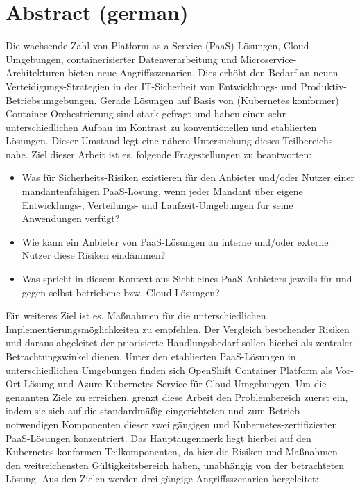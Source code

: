 \chapter*{Abstract (german)}
\thispagestyle{empty}
Die wachsende Zahl von Platform-as-a-Service (PaaS) Lösungen, Cloud-Umgebungen, containerisierter Datenverarbeitung und Microservice-Architekturen bieten neue Angriffsszenarien.
Dies erhöht den Bedarf an neuen Verteidigungs-Strategien in der IT-Sicherheit von Entwicklungs- und Produktiv-Betriebsumgebungen.
Gerade Lösungen auf Basis von (Kubernetes konformer) Container-Orchestrierung sind stark gefragt und haben einen sehr unterschiedlichen Aufbau im Kontrast zu konventionellen und etablierten Lösungen.
Dieser Umstand legt eine nähere Untersuchung dieses Teilbereichs nahe.
Ziel dieser Arbeit ist es, folgende Fragestellungen zu beantworten:

\begin{itemize}

\item Was für Sicherheits-Risiken existieren für den Anbieter und/oder Nutzer einer mandantenfähigen PaaS-Lösung, wenn jeder Mandant über eigene Entwicklungs-, Verteilungs- und Laufzeit-Umgebungen für seine Anwendungen verfügt?

\item Wie kann ein Anbieter von PaaS-Lösungen an interne und/oder externe Nutzer diese Risiken eindämmen?

\item Was spricht in diesem Kontext aus Sicht eines PaaS-Anbieters jeweils für und gegen selbst betriebene bzw. Cloud-Lösungen?

\end{itemize}

Ein weiteres Ziel ist es, Maßnahmen für die unterschiedlichen Implementierungsmöglichkeiten zu empfehlen.
Der Vergleich bestehender Risiken und daraus abgeleitet der priorisierte Handlungsbedarf sollen hierbei als zentraler Betrachtungswinkel dienen.
Unter den etablierten PaaS-Lösungen in unterschiedlichen Umgebungen finden sich OpenShift Container Platform als Vor-Ort-Lösung und Azure Kubernetes Service für Cloud-Umgebungen.
Um die genannten Ziele zu erreichen, grenzt diese Arbeit den Problembereich zuerst ein, indem sie sich auf die standardmäßig eingerichteten und zum Betrieb notwendigen Komponenten dieser zwei gängigen und Kubernetes-zertifizierten PaaS-Lösungen konzentriert.
Das Hauptaugenmerk liegt hierbei auf den Kubernetes-konformen Teilkomponenten, da hier die Risiken und Maßnahmen den weitreichensten Gültigkeitsbereich haben, unabhängig von der betrachteten Lösung.
Aus den Zielen werden drei gängige Angriffsszenarien hergeleitet: 

